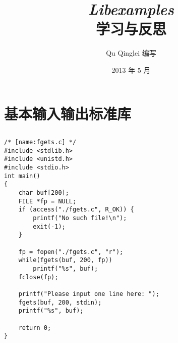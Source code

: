 \documentclass{article}
\begin{document}
\title{%
  {\huge \textit{Libexamples}\\\smallskip}%
  {\LARGE \textsf{学习与反思}}
}

\author{Qu Qinglei 编写 \\[3mm]
       }

\date{2013 年 5 月}

\maketitle

\begin{multicols}{2}
\tableofcontents
\end{multicols}

\section{基本输入输出标准库}
\subsection{}
\begin{verbatim}
/* [name:fgets.c] */
#include <stdlib.h>
#include <unistd.h>
#include <stdio.h>
int main()
{
	char buf[200];
	FILE *fp = NULL;
	if (access("./fgets.c", R_OK)) {
		printf("No such file!\n");
		exit(-1);
	}

	fp = fopen("./fgets.c", "r");
	while(fgets(buf, 200, fp))
		printf("%s", buf);
	fclose(fp);

	printf("Please input one line here: ");
	fgets(buf, 200, stdin);
	printf("%s", buf);

	return 0;
}
\end{verbatim}
\end{document}
